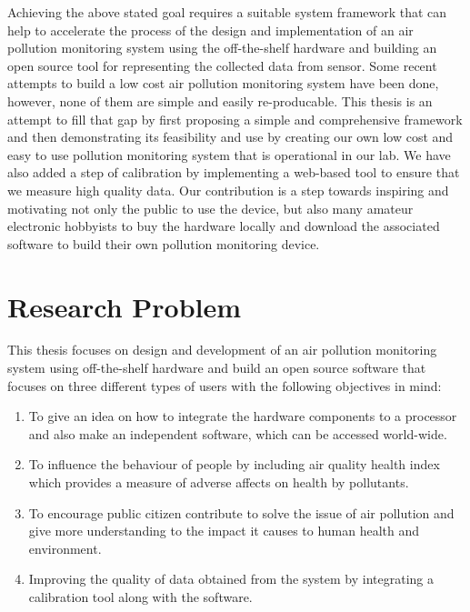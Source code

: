 \par

Achieving the above stated goal requires a suitable system framework that can help to accelerate the process of the design and implementation of an air pollution monitoring system using the off-the-shelf hardware and building an open source tool for representing the collected data from sensor. Some recent attempts to build a low cost air pollution monitoring system have been done, however, none of them are simple and easily re-producable. This thesis is an attempt to fill that gap by first proposing a simple and comprehensive framework and then demonstrating its feasibility and use by creating our own low cost and easy to use pollution monitoring system that is operational in our lab. We have also added a step of calibration by implementing a web-based tool to ensure that we measure high quality data. Our contribution is a step towards inspiring and motivating not only the public to use the device, but also many amateur electronic hobbyists to buy the hardware locally and download the associated software to build their own pollution monitoring device.


\section{Research Problem}
This thesis focuses on design and development of an air pollution monitoring system using off-the-shelf
hardware and build an open source software that focuses on three different types of users with the following objectives in mind:
\begin{enumerate}
   
  \item To give an idea on how to integrate the hardware components to a processor and also make an independent software, which can be accessed world-wide.
  
  \item To influence the behaviour of people by including air quality health index which provides a measure of adverse affects on health by pollutants.

  \item To encourage public citizen contribute to solve the issue of air pollution and give more understanding to the impact it causes to human health and environment.
   
  \item Improving the quality of data obtained from the system by integrating a calibration tool along with the software.
   

\end{enumerate}


